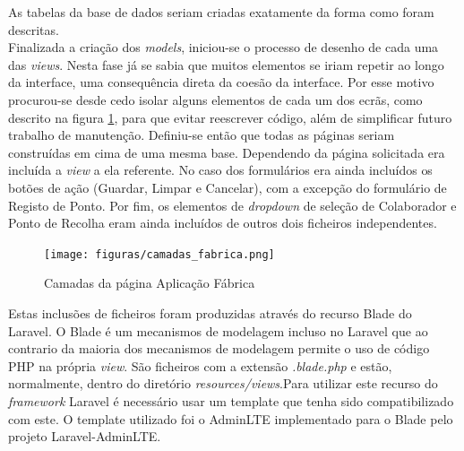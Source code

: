 \noindent
As tabelas da base de dados seriam criadas exatamente da forma como foram descritas.\\
Finalizada a criação dos \textit{models}, iniciou-se o processo de desenho de cada uma das \textit{views}. Nesta fase já se sabia que muitos elementos se iriam repetir ao longo da interface, uma consequência direta da coesão da interface. Por esse motivo procurou-se desde cedo isolar alguns elementos de cada um dos ecrãs, como descrito na figura \ref{fig:ui_fabrica_camadas}, para que evitar reescrever código, além de simplificar futuro trabalho de manutenção. Definiu-se então que todas as páginas seriam construídas em cima de uma mesma base. Dependendo da página solicitada era incluída a \textit{view} a ela referente. No caso dos formulários era ainda incluídos os botões de ação (Guardar, Limpar e Cancelar), com a excepção do formulário de Registo de Ponto. Por fim, os elementos de \textit{dropdown} de seleção de Colaborador e Ponto de Recolha eram ainda incluídos de outros dois ficheiros independentes. 
\begin{figure}[htbp] 
	\begin{center}
		\texttt{[image: figuras/camadas\_fabrica.png]}
		\caption{Camadas da página Aplicação Fábrica}
		\label{fig:ui_fabrica_camadas} 
	\end{center}
\end{figure}

\noindent
Estas inclusões de ficheiros foram produzidas através do recurso Blade do Laravel. O Blade é um mecanismos de modelagem incluso no Laravel que ao contrario da maioria dos mecanismos de modelagem permite o uso de código PHP na própria \textit{view}. São ficheiros com a extensão \textit{.blade.php} e estão, normalmente, dentro do diretório \textit{resources/views}\cite{Laravela}.Para utilizar este recurso do \textit{framework} Laravel é necessário usar um template que tenha sido compatibilizado com este. O template utilizado foi o AdminLTE\cite{AlmsaeedStudio} implementado para o Blade pelo projeto Laravel-AdminLTE\cite{Noten}.

